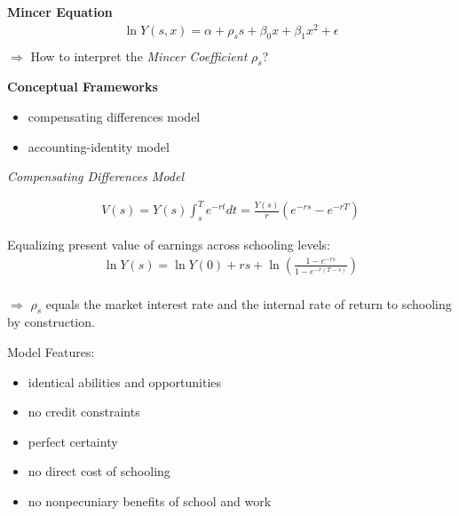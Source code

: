 \begin{frame}\nocite{Mincer.1958,Mincer.1974}
\textbf{Mincer Equation}\\
\begin{align*}
\ln Y(s, x) = \alpha + \rho_s s + \beta_0 x + \beta_1 x^2 + \epsilon\\
\end{align*}
$\Rightarrow$ How to interpret the \textit{Mincer Coefficient} $\rho_s$?
\end{frame}




\begin{frame}
\textbf{Conceptual Frameworks}
\begin{itemize}
\item compensating differences model
\item accounting-identity model
\end{itemize}
\end{frame}

\begin{frame}\begin{center}
\LARGE\textit{Compensating Differences Model}
\end{center}\end{frame}

\begin{frame}
\begin{align*}
V(s) = Y(s)\int_s^T e^{-rt} dt = \frac{Y(s)}{r}(e^{-rs} - e^{-rT})
\end{align*}

\end{frame}

\begin{frame}

Equalizing present value of earnings across schooling levels:
\begin{align*}
\ln Y(s) = \ln Y(0) + r s + \ln\left(\frac{1 -e^{-rs}}{1 - e^{-r(T - s)}}\right) \\
\end{align*}

$\Rightarrow$ $\rho_s$ equals the market interest rate and the internal rate of return to schooling by construction.
\end{frame}

\begin{frame}
Model Features:
\begin{itemize}
\item identical abilities and opportunities
\item no credit constraints
\item perfect certainty
\item no direct cost of schooling
\item no nonpecuniary benefits of school and work
\end{itemize}
\end{frame}


